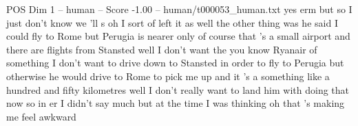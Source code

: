 \begin{textsample}{POS Dim 1 – human – Score -1.00 – human/t000053\_human.txt}  \label{ex:f1_pos_020}
yes erm but so I just don't know we 'll s oh I sort of left it as well the other thing was he said I could fly to Rome but Perugia is nearer only of course that 's a small airport and there are flights from Stansted well I don't want the you know Ryanair of something I don't want to drive down to Stansted in order to fly to Perugia but otherwise he would drive to Rome to pick me up and it 's a something like a hundred and fifty kilometres well I don't really want to land him with doing that now so in er I didn't say much but at the time I was thinking oh that 's making me feel awkward

\end{textsample}
